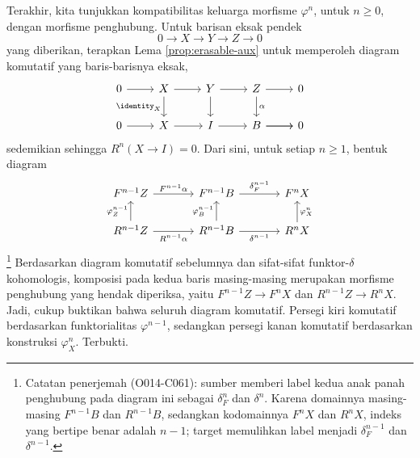 \begin{bukti}
	Terakhir, kita tunjukkan kompatibilitas keluarga morfisme $\varphi^n$, untuk $n \geq 0$, dengan morfisme penghubung. Untuk barisan eksak pendek
	\[0 \to X \to Y \to Z \to 0\]
	yang diberikan, terapkan Lema \ref{prop:erasable-aux} untuk memperoleh diagram komutatif yang baris-barisnya eksak,
	\[\begin{tikzcd}
		0 \arrow[r] & X \arrow[d, "\identity_X"'] \arrow[r] & Y \arrow[r] \arrow[d] & Z \arrow[d, "\alpha"] \arrow[r] & 0 \\
		0 \arrow[r] & X \arrow[r] & I \arrow[r] & \arrow[r] B \arrow[r] & 0
	\end{tikzcd}\]
	sedemikian sehingga $R^n(X \to I) = 0$. Dari sini, untuk setiap $n \geq 1$, bentuk diagram
	\[\begin{tikzcd}[column sep=large]
		F^{n-1} Z \arrow[r, "{F^{n-1}\alpha}"] & F^{n-1} B \arrow[r, "{\delta_F^{n-1}}"] & F^n X \\
		R^{n-1} Z \arrow[u, "{\varphi_Z^{n-1}}"] \arrow[r, "{R^{n-1}\alpha}"'] & R^{n-1} B \arrow[u, "{\varphi_B^{n-1}}"] \arrow[r, "{\delta^{n-1}}"'] & R^n X \arrow[u, "{\varphi_X^n}"']
	\end{tikzcd}\]
\footnote{Catatan penerjemah (O014-C061): sumber memberi label kedua anak
panah penghubung pada diagram ini sebagai $\delta_F^n$ dan $\delta^n$.
Karena domainnya masing-masing $F^{n-1}B$ dan $R^{n-1}B$, sedangkan
kodomainnya $F^nX$ dan $R^nX$, indeks yang bertipe benar adalah $n-1$;
target memulihkan label menjadi $\delta_F^{n-1}$ dan $\delta^{n-1}$.}
	Berdasarkan diagram komutatif sebelumnya dan sifat-sifat funktor-$\delta$ kohomologis, komposisi pada kedua baris masing-masing merupakan morfisme penghubung yang hendak diperiksa, yaitu $F^{n-1} Z \to F^n X$ dan $R^{n-1} Z \to R^n X$. Jadi, cukup buktikan bahwa seluruh diagram komutatif. Persegi kiri komutatif berdasarkan funktorialitas $\varphi^{n-1}$, sedangkan persegi kanan komutatif berdasarkan konstruksi $\varphi^n_X$. Terbukti.
\end{bukti}

